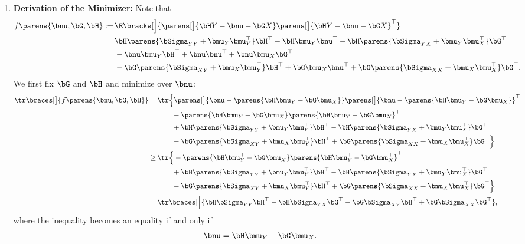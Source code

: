\documentclass[12pt]{article}
\begin{document}
\begin{enumerate}[label=\textbf{\arabic*.}]
	\item \textbf{Derivation of the Minimizer:} Note that 
	\begin{align}
		f \parens{\bnu, \bG, \bH} := & \, \E \bracks[\Big]{\parens[\big]{\bH Y - \bnu - \bG X} \parens[\big]{\bH Y - \bnu - \bG X}^\top} \nonumber \\ 
		= & \, \bH \parens{\bSigma_{YY} + \bmu_Y \bmu_Y^\top} \bH^\top - \bH \bmu_Y \bnu^\top - \bH \parens{\bSigma_{YX} + \bmu_Y \bmu_X^\top} \bG^\top \nonumber \\
		\qquad \qquad &\, - \bnu \bmu_Y \bH^\top + \bnu \bnu^\top + \bnu \bmu_X \bG^\top \nonumber \\ 
		\qquad \qquad & \, - \bG \parens{\bSigma_{XY} + \bmu_X \bmu_Y^\top} \bH^\top + \bG \bmu_X \bnu^\top + \bG \parens{\bSigma_{XX} + \bmu_X \bmu_X^\top} \bG^\top. 
	\end{align}
	We first fix $\bG$ and $\bH$ and minimize over $\bnu$: 
	\begin{align*}
		\tr \braces[\big]{f \parens{\bnu, \bG, \bH}} = & \, \tr \Big\{ \parens[\big]{\bnu - \parens{\bH \bmu_Y - \bG \bmu_X}} \parens[\big]{\bnu - \parens{\bH \bmu_Y - \bG \bmu_X}}^\top \\ 
		& \, \qquad - \parens{\bH \bmu_Y - \bG \bmu_X} \parens{\bH \bmu_Y - \bG \bmu_X}^\top \\ 
		& \, \qquad + \bH \parens{\bSigma_{YY} + \bmu_Y \bmu_Y^\top} \bH^\top - \bH \parens{\bSigma_{YX} + \bmu_Y \bmu_X^\top} \bG^\top \\ 
		& \, \qquad - \bG \parens{\bSigma_{XY} + \bmu_X \bmu_Y^\top} \bH^\top + \bG \parens{\bSigma_{XX} + \bmu_X \bmu_X^\top} \bG^\top \Big\} \\
		\ge & \, \tr \Big\{ - \parens{\bH \bmu_Y^\top - \bG \bmu_X^\top} \parens{\bH \bmu_Y^\top - \bG \bmu_X^\top}^\top \\ 
		& \, \qquad + \bH \parens{\bSigma_{YY} + \bmu_Y \bmu_Y^\top} \bH^\top - \bH \parens{\bSigma_{YX} + \bmu_Y \bmu_X^\top} \bG^\top \\ 
		& \, \qquad - \bG \parens{\bSigma_{XY} + \bmu_X \bmu_Y^\top} \bH^\top + \bG \parens{\bSigma_{XX} + \bmu_X \bmu_X^\top} \bG^\top \Big\} \\
		= & \, \tr \braces[\Big]{\bH \bSigma_{YY} \bH^\top - \bH \bSigma_{YX} \bG^\top - \bG \bSigma_{XY} \bH^\top + \bG \bSigma_{XX} \bG^\top},  
	\end{align*}
	where the inequality becomes an equality if and only if 
	\begin{align}
		\bnu = \bH \bmu_Y - \bG \bmu_X. 
	\end{align}

\end{enumerate}
\end{document}
